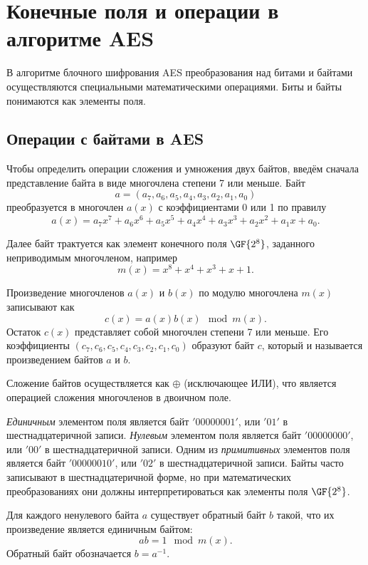 \section{Конечные поля и операции в алгоритме AES}

В алгоритме блочного шифрования AES преобразования над битами и байтами осуществляются специальными математическими операциями. Биты и байты понимаются как элементы поля.

\subsection{Операции с байтами в AES}

Чтобы определить операции сложения и умножения двух байтов, введём сначала представление байта в виде многочлена степени 7 или меньше. Байт
    \[ a =( a_7, a_6, a_5, a_4, a_3, a_2, a_1, a_0) \]
преобразуется в многочлен $a(x)$ с коэффициентами 0 или 1 по правилу
    \[ a(x) = a_{7}x^{7}+a_{6}x^{6}+a_{5}x^{5}+a_{4}x^{4}+a_{3}x^{3}+a_{2}x^{2}+a_{1}x+a_{0}. \]

Далее байт трактуется как элемент конечного поля $\GF{2^8}$, заданного неприводимым многочленом, например
    \[ m(x) = x^{8}+x^{4}+x^{3}+x +1. \]

Произведение многочленов $a(x)$ и $b(x)$ по модулю многочлена $m(x)$ записывают как
    \[ c(x) = a(x) b(x) \mod m(x). \]
Остаток $c(x)$ представляет собой многочлен степени 7 или меньше. Его коэффициенты $(c_{7}, c_{6}, c_{5}, c_{4}, c_{3}, c_{2}, c_{1}, c_{0})$ образуют байт $c$, который и называется произведением байтов $a$ и $b$.

Сложение байтов осуществляется как $\oplus$ (исключающее ИЛИ), что является операцией сложения многочленов в двоичном поле.

\emph{Единичным} элементом поля является байт $\mathrm{'00000001'}$, или $\mathrm{'01'}$ в шестнадцатеричной записи. \emph{Нулевым} элементом поля является байт $\mathrm{'00000000'}$, или $\mathrm{'00'}$ в шестнадцатеричной записи. Одним из \emph{примитивных} элементов поля является байт $\mathrm{'00000010'}$, или $\mathrm{'02'}$ в шестнадцатеричной записи. Байты часто записывают в шестнадцатеричной форме, но при математических преобразованиях они должны интерпретироваться как элементы поля $\GF{2^8}$.

Для каждого ненулевого байта $a$ существует обратный байт $b$ такой, что их произведение является единичным байтом:
    \[ a b = 1 \mod m(x). \]
Обратный байт обозначается $b = a^{-1}$.

